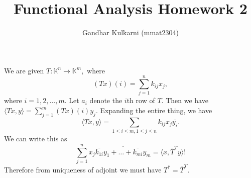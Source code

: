 \documentclass{article}
\title{Functional Analysis Homework 2} %
\author{Gandhar Kulkarni (mmat2304)} %
\date{} %
\begin{document}
\maketitle %


\section{} %
\section{} %
\section{} %
\section{} %
\section{} %
\section{} %
\section{} %
\section{} %
\section{} %
We are given $T: \mathbb{K}^n \to \mathbb{K}^m,$ where $$(Tx)(i)=\sum_{j=1}^{n}k_{ij}x_j,$$
where $i=1,2,\dots,m.$ Let $a_i$ denote the $i$th row of $T.$ Then we have $\langle Tx,y \rangle= \sum_{j=1}^m (Tx)(i)y_j.$
Expanding the entire thing, we have $$ \langle Tx,y\rangle= \sum_{1 \leq i \leq m, 1 \leq j \leq n} k_{ij}x_j \bar{y_i}.$$ We can write this as 
$$\sum_{j=1}^n x_j \overline{\overline{k_{1i}}y_1 + \dots + \overline{k_{mi}}y_m} = \langle x, \overline{T}^{T}y \rangle!$$ Therefore from uniqueness of 
adjoint we must have $T^{*}= \overline{T}^{T}.$
\section{} %
\end{document}
